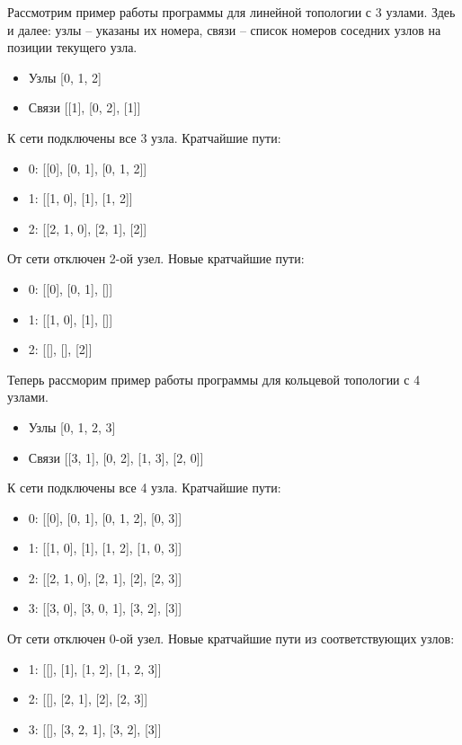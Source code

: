 Рассмотрим пример работы программы для линейной топологии с 3 узлами. Здеь и далее: узлы – указаны их номера, связи – список номеров соседних узлов на позиции текущего узла.

\begin{itemize}
	\item Узлы [0, 1, 2]
	\item Связи [[1], [0, 2], [1]]
\end{itemize}

К сети подключены все 3 узла. Кратчайшие пути:
\begin{itemize}
	\item 0: [[0], [0, 1], [0, 1, 2]]
	\item 1: [[1, 0], [1], [1, 2]]
	\item 2: [[2, 1, 0], [2, 1], [2]]
\end{itemize}

От сети отключен 2-ой узел. Новые кратчайшие пути:
\begin{itemize}
	\item 0: [[0], [0, 1], []]
	\item 1: [[1, 0], [1], []]
	\item 2: [[], [], [2]]
\end{itemize}

Теперь рассморим пример работы программы для кольцевой топологии с 4 узлами.
\begin{itemize}
	\item Узлы [0, 1, 2, 3]
	\item Связи [[3, 1], [0, 2], [1, 3], [2, 0]]
\end{itemize}

К сети подключены все 4 узла. Кратчайшие пути:
\begin{itemize}
	\item 0: [[0], [0, 1], [0, 1, 2], [0, 3]]
	\item 1: [[1, 0], [1], [1, 2], [1, 0, 3]]
	\item 2: [[2, 1, 0], [2, 1], [2], [2, 3]]
    \item 3: [[3, 0], [3, 0, 1], [3, 2], [3]]
\end{itemize}

От сети отключен 0-ой узел. Новые кратчайшие пути из соответствующих узлов:
\begin{itemize}
	\item 1: [[], [1], [1, 2], [1, 2, 3]]
    \item 2: [[], [2, 1], [2], [2, 3]]
	\item 3: [[], [3, 2, 1], [3, 2], [3]]
\end{itemize}


